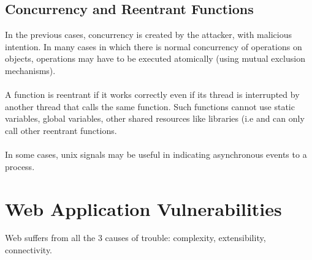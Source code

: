 \documentclass[10pt,a4paper]{report}
\begin{document}
\subsection{Concurrency and Reentrant Functions}
In the previous cases, concurrency is created by the attacker, with malicious intention. In many cases in which there is normal concurrency of operations on objects, operations may have to be executed atomically (using mutual exclusion mechanisms).\\
\\
A function is reentrant if it works correctly even if its thread is interrupted by another thread that calls the same function. Such functions cannot use static variables, global variables, other shared resources like libraries (i.e and can only call other reentrant functions.\\
\\
In some cases, unix signals may be useful in indicating asynchronous events to a process.

\section{Web Application Vulnerabilities}
Web suffers from all the 3 causes of trouble: complexity, extensibility, connectivity.
\end{document}
